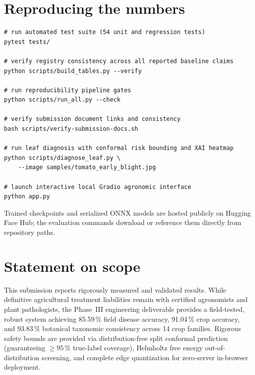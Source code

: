 \section{Reproducing the numbers}

\begin{verbatim}
# run automated test suite (54 unit and regression tests)
pytest tests/

# verify registry consistency across all reported baseline claims
python scripts/build_tables.py --verify

# run reproducibility pipeline gates
python scripts/run_all.py --check

# verify submission document links and consistency
bash scripts/verify-submission-docs.sh

# run leaf diagnosis with conformal risk bounding and XAI heatmap
python scripts/diagnose_leaf.py \
    --image samples/tomato_early_blight.jpg

# launch interactive local Gradio agronomic interface
python app.py
\end{verbatim}

Trained checkpoints and serialized ONNX models are hosted publicly on Hugging Face
Hub; the evaluation commands download or reference them directly from repository paths.

\section{Statement on scope}

This submission reports rigorously measured and validated results. While definitive
agricultural treatment liabilities remain with certified agronomists and plant pathologists,
the Phase~III engineering deliverable provides a field-tested, robust system achieving
85.59\,\% field disease accuracy, 91.04\,\% crop accuracy, and 93.83\,\% botanical taxonomic
consistency across 14 crop families. Rigorous safety bounds are provided via distribution-free
split conformal prediction (guaranteeing $\ge 95\,\%$ true-label coverage), Helmholtz free energy
out-of-distribution screening, and complete edge quantization for zero-server in-browser deployment.
